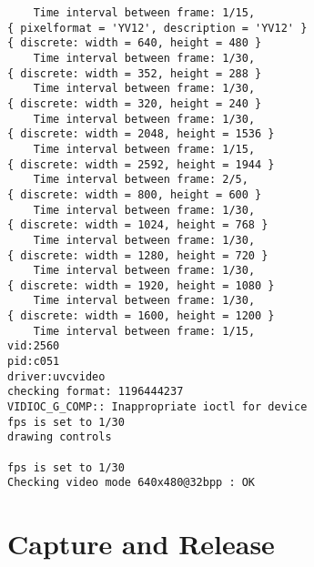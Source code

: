 \documentclass{article}
\begin{document}
\begin{lstlisting}
	Time interval between frame: 1/15, 
{ pixelformat = 'YV12', description = 'YV12' }
{ discrete: width = 640, height = 480 }
	Time interval between frame: 1/30, 
{ discrete: width = 352, height = 288 }
	Time interval between frame: 1/30, 
{ discrete: width = 320, height = 240 }
	Time interval between frame: 1/30, 
{ discrete: width = 2048, height = 1536 }
	Time interval between frame: 1/15, 
{ discrete: width = 2592, height = 1944 }
	Time interval between frame: 2/5, 
{ discrete: width = 800, height = 600 }
	Time interval between frame: 1/30, 
{ discrete: width = 1024, height = 768 }
	Time interval between frame: 1/30, 
{ discrete: width = 1280, height = 720 }
	Time interval between frame: 1/30, 
{ discrete: width = 1920, height = 1080 }
	Time interval between frame: 1/30, 
{ discrete: width = 1600, height = 1200 }
	Time interval between frame: 1/15, 
vid:2560 
pid:c051 
driver:uvcvideo
checking format: 1196444237
VIDIOC_G_COMP:: Inappropriate ioctl for device
fps is set to 1/30
drawing controls

fps is set to 1/30
Checking video mode 640x480@32bpp : OK 
\end{lstlisting}



\section{Capture and Release}
\end{document}
